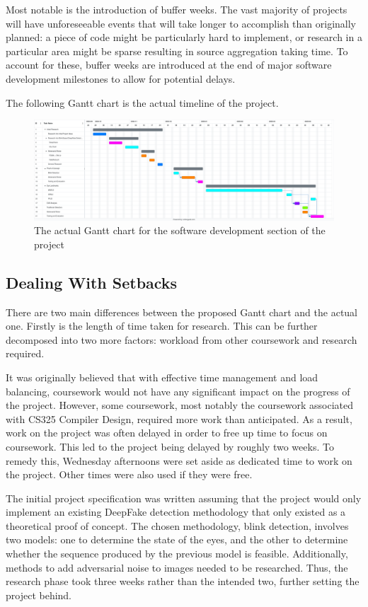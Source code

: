 Most notable is the introduction of buffer weeks. The vast majority of projects will have unforeseeable events that will take longer to accomplish than originally planned: a piece of code might be particularly hard to implement, or research in a particular area might be sparse resulting in source aggregation taking time. To account for these, buffer weeks are introduced at the end of major software development milestones to allow for potential delays.

The following Gantt chart is the actual timeline of the project.

\begin{figure}[H]
    \centering
    \includegraphics[width=1\linewidth]{dissertation/figures/actual-gantt.png}
    \caption{The actual Gantt chart for the software development section of the project}
    \label{fig:actual-gantt}
\end{figure}


\subsection{Dealing With Setbacks}

There are two main differences between the proposed Gantt chart and the actual one. Firstly is the length of time taken for research. This can be further decomposed into two more factors: workload from other coursework and research required. 

It was originally believed that with effective time management and load balancing, coursework would not have any significant impact on the progress of the project. However, some coursework, most notably the coursework associated with CS325 Compiler Design, required more work than anticipated. As a result, work on the project was often delayed in order to free up time to focus on coursework. This led to the project being delayed by roughly two weeks. To remedy this, Wednesday afternoons were set aside as dedicated time to work on the project. Other times were also used if they were free. 

The initial project specification was written assuming that the project would only implement an existing DeepFake detection methodology that only existed as a theoretical proof of concept. The chosen methodology, blink detection, involves two models: one to determine the state of the eyes, and the other to determine whether the sequence produced by the previous model is feasible. Additionally, methods to add adversarial noise to images needed to be researched. Thus, the research phase took three weeks rather than the intended two, further setting the project behind.

